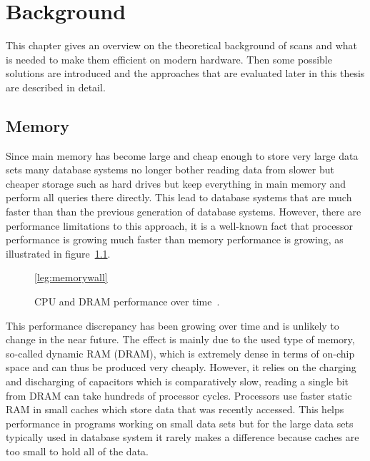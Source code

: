\chapter{Background}

This chapter gives an overview on the theoretical background of scans and what
is needed to make them efficient on modern hardware. Then some possible
solutions are introduced and the approaches that are evaluated later in this
thesis are described in detail.

\section{Memory}

Since main memory has become large and cheap enough to store very large data
sets many database systems no longer bother reading data from slower but
cheaper storage such as hard drives but keep everything in main memory and
perform all queries there directly. This lead to database systems that are much
faster than than the previous generation of database systems. However, there
are performance limitations to this approach, it is a well-known fact that
processor performance is growing much faster than memory performance is growing,
as illustrated in figure~\ref{fig:memorywall}.

\begin{figure}[h] \begin{center}
\ref*{leg:memorywall}
\end{center}
\caption{CPU and DRAM performance over time~\cite{hennessyarch}.}
\label{fig:memorywall}
\end{figure}

This performance discrepancy has been growing over time and is unlikely to
change in the near future. The effect is mainly due to the used type of memory,
so-called dynamic RAM (DRAM), which is extremely dense in terms of on-chip space
and can thus be produced very cheaply. However, it relies on the charging and
discharging of capacitors which is comparatively slow, reading a single bit from
DRAM can take hundreds of processor cycles. Processors use faster static RAM in
small caches which store data that was recently accessed. This helps performance
in programs working on small data sets but for the large data sets typically
used in database system it rarely makes a difference because caches are too
small to hold all of the data.

